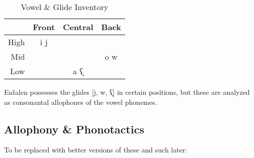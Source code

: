 \documentclass[a4paper,11pt,oneside,openany]{memoir}
\newcommand{\bripa}[1]{[#1]}
\newcommand{\pharox}{ʕ}
\newcommand{\dwnwrd}{̞}
\newcommand{\parentlang}{Enłalen}
\begin{document}
\begin{table}[h]
    \centering
    \begin{tabular}{@{}rccc@{}}
    \toprule
    \multicolumn{1}{l}{} & Front & Central & Back \\ \midrule
    High & i j &  &  \\
    Mid &  &  & o w \\
    Low &  & a \pharox\dwnwrd &  \\ \bottomrule
    \end{tabular}
    \caption{Vowel \& Glide Inventory}
    \label{tab:enl-vowels}
\end{table}

\parentlang{} possesses the glides \bripa{j, w, \pharox\dwnwrd} in certain positions, but these are analyzed as consonantal allophones of the vowel phonemes.

\subsection{Allophony \& Phonotactics}

To be replaced with better versions of these and such later:
\end{document}
